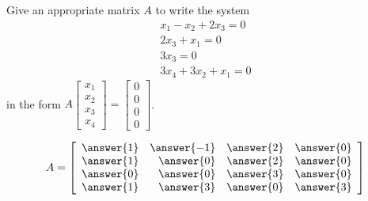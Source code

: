 \documentclass{ximera}
\begin{document}
\begin{problem}\label{prb:4.21} Give an appropriate matrix $A$ to write the system
\begin{equation*}
\begin{array}{c}
x_{1}-x_{2}+2x_{3} = 0 \\
2x_{3}+x_{1} = 0\\
3x_{3} = 0 \\
3x_{4}+3x_{2}+x_{1} = 0
\end{array}
\end{equation*}
 in the form $A\left[
\begin{array}{c}
x_{1} \\
x_{2} \\
x_{3} \\
x_{4}
\end{array}
\right] = \left[
\begin{array}{c}
0 \\
0 \\
0 \\
0
\end{array}
\right] $.

$$A=\left[
\begin{array}{rrrr}
\answer{1} & \answer{-1} & \answer{2} & \answer{0} \\
\answer{1} & \answer{0} & \answer{2} & \answer{0} \\
\answer{0} & \answer{0} & \answer{3} & \answer{0} \\
\answer{1} & \answer{3} & \answer{0} & \answer{3}
\end{array}
\right] $$

\end{problem}
\end{document}
